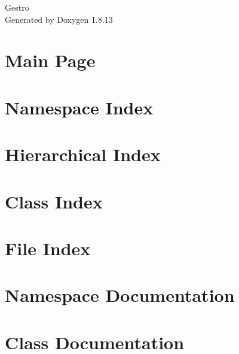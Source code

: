 \documentclass[twoside]{book}
\newcommand{\+}{\discretionary{\mbox{\scriptsize$\hookleftarrow$}}{}{}}
\newcommand{\clearemptydoublepage}{%
  \newpage{\pagestyle{empty}\cleardoublepage}%
}
\begin{document}
\hypersetup{pageanchor=false,
             bookmarksnumbered=true,
             pdfencoding=unicode
            }
\begin{titlepage}
\vspace*{7cm}
\begin{center}%
{\Large Gestro }\\
\vspace*{1cm}
{\large Generated by Doxygen 1.8.13}\\
\end{center}
\end{titlepage}
\clearemptydoublepage
{}
\tableofcontents
\clearemptydoublepage
{}
\hypersetup{pageanchor=true}

\chapter{Main Page}
\label{index}\hypertarget{index}{}
\chapter{Namespace Index}

\chapter{Hierarchical Index}

\chapter{Class Index}

\chapter{File Index}

\chapter{Namespace Documentation}



\chapter{Class Documentation}
















\end{document}
